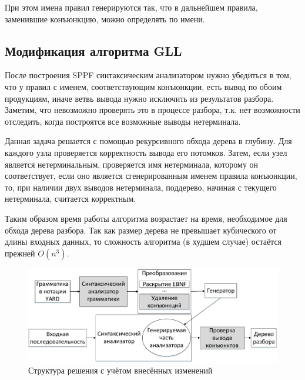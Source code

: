 При этом имена правил генерируются так, что в дальнейшем правила, заменившие конъюнкцию, можно определять по имени.

\subsection{Модификация алгоритма GLL}

После построения SPPF синтаксическим анализатором нужно убедиться в том, что у правил с именем, соответствующим конъюнкции, есть вывод по обоим продукциям, иначе ветвь вывода нужно исключить из результатов разбора. Заметим, что невозможно проверять это в процессе разбора, т.к. нет возможности отследить, когда построятся все возможные выводы нетерминала.

Данная задача решается с помощью рекурсивного обхода дерева в глубину. Для каждого узла проверяется корректность вывода его потомков. Затем, если узел является нетерминальным, проверяется имя нетерминала, которому он соответствует, если оно является сгенерированным именем правила конъюнкции, то, при наличии двух выводов нетерминала, поддерево, начиная с текущего нетерминала, считается корректным.

Таким образом время работы алгоритма возрастает на время, необходимое для обхода дерева разбора. Так как размер дерева не превышает кубического от длины входных данных, то сложность алгоритма (в худшем случае) остаётся прежней $O(n^3)$.

\begin{figure}
\centering
\includegraphics[width=\textwidth]{Gorokhov/courseworkpictures/img3.pdf}
\caption{Структура решения с учётом внесённых изменений}
\label{structure}
\end{figure}
